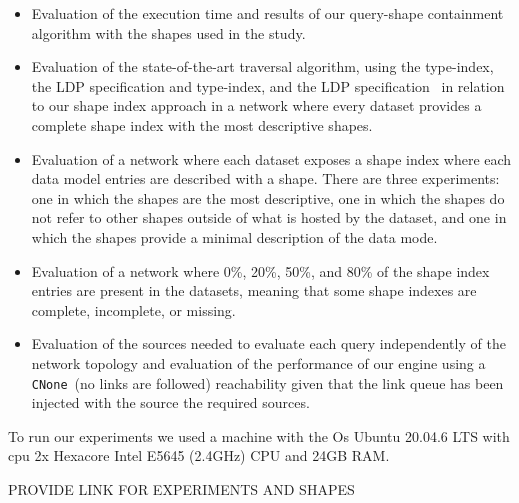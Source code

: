 \begin{itemize}
   \item Evaluation of the execution time and results of our query-shape containment algorithm with the shapes used in the study.
   \item Evaluation of the state-of-the-art traversal algorithm, using the type-index, the LDP specification and type-index, and the LDP specification~\cite{taelman2023} in relation to our shape index approach in a network where every dataset provides a complete shape index with the most descriptive shapes.
   \item Evaluation of a network where each dataset exposes a shape index where each data model entries are described with a shape. 
   There are three experiments: one in which the shapes are the most descriptive, one in which the shapes do not refer to other shapes outside of what is hosted by the dataset, and one in which the shapes provide a minimal description of the data mode.
   \item Evaluation of a network where 0\%, 20\%, 50\%, and 80\% of the shape index entries are present in the datasets, meaning that some shape indexes are complete, incomplete, or missing.
   \item Evaluation of the sources needed to evaluate each query independently of the network topology and evaluation of the performance of our engine using a \texttt{CNone}~\cite{Hartig2012}(no links are followed) reachability given that the link queue has been injected with the source the required sources.
 \end{itemize}

To run our experiments we used a machine with the Os Ubuntu 20.04.6 LTS with cpu 2x Hexacore Intel E5645 (2.4GHz) CPU and 24GB RAM.

PROVIDE LINK FOR EXPERIMENTS AND SHAPES
\iffalse
102x pcgen3 nodes
https://doc.ilabt.imec.be/ilabt/virtualwall/hardware.html#virtual-wall-2
\fi
